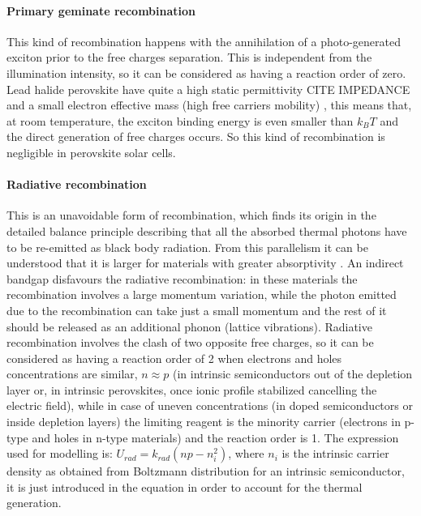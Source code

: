 \paragraph{Primary geminate recombination} \label{intro_geminate} This kind of recombination happens with the annihilation of a photo-generated exciton prior to the free charges separation. This is independent from the illumination intensity, so it can be considered as having a reaction order of zero. Lead halide perovskite have quite a high static permittivity CITE IMPEDANCE and a small electron effective mass (high free carriers mobility) \cite{Herz2017}, this means that, at room temperature, the exciton binding energy is even smaller than $k_BT$ \cite{Miyata2015,Galkowski2016} and the direct generation of free charges occurs. So this kind of recombination is negligible in perovskite solar cells. %

\paragraph{Radiative recombination} This is an unavoidable form of recombination, which finds its origin in the detailed balance principle describing that all the absorbed thermal photons have to be re-emitted as black body radiation. From this parallelism it can be understood that it is larger for materials with greater absorptivity \cite{Nelson2003}. An indirect bandgap disfavours the radiative recombination: in these materials the recombination involves a large momentum variation, while the photon emitted due to the recombination can take just a small momentum and the rest of it should be released as an additional phonon (lattice vibrations). Radiative recombination involves the clash of two opposite free charges, so it can be considered as having a reaction order of 2 when electrons and holes concentrations are similar, $n \approx p$ (in intrinsic semiconductors out of the depletion layer or, in intrinsic perovskites, once ionic profile stabilized cancelling the electric field), while in case of uneven concentrations (in doped semiconductors or inside depletion layers) the limiting reagent is the minority carrier (electrons in p-type and holes in n-type materials) and the reaction order is 1. The expression used for modelling is: $U_{rad} = k_{rad} (np-n_i^2)$, where $n_i$ is the intrinsic carrier density as obtained from Boltzmann distribution for an intrinsic semiconductor, it is just introduced in the equation in order to account for the thermal generation.

